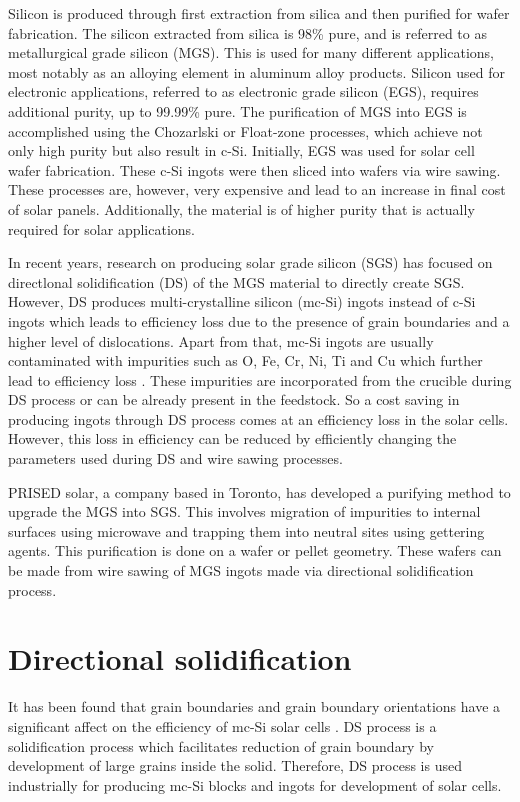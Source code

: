 Silicon is produced through first extraction from silica and then purified for wafer fabrication. The silicon extracted from silica is 98\% pure, and is referred to as metallurgical grade silicon (MGS). This is used for many different applications, most notably as an alloying element in aluminum alloy products. Silicon used for electronic applications, referred to as electronic grade silicon (EGS), requires additional purity, up to 99.99\% pure. The purification of MGS into EGS is accomplished using the Chozarlski or Float-zone processes, which achieve not only high purity but also result in c-Si. Initially, EGS was used for solar cell wafer fabrication. These c-Si ingots were then sliced into wafers via wire sawing. These processes are, however, very expensive and lead to an increase in final cost of solar panels. Additionally, the material is of higher purity that is actually required for solar applications.

In recent years, research on producing solar grade silicon (SGS) has focused on directlonal solidification (DS) of the MGS material to directly create SGS. However, DS produces multi-crystalline silicon (mc-Si) ingots instead of c-Si ingots which leads to efficiency loss due to the presence of grain boundaries and a higher level of dislocations.  Apart from that, mc-Si ingots are usually contaminated with impurities such as O, Fe, Cr, Ni, Ti and Cu which further lead to efficiency loss \cite{davis1980impurities,coletti2011impact} . These impurities are incorporated from the crucible during DS process \cite{istratov2003metal} or can be already present in the feedstock. So a cost saving in producing ingots through DS process comes at an efficiency loss in the solar cells. However, this loss in efficiency can be reduced by efficiently changing the parameters used during DS and wire sawing processes.

PRISED solar, a company based in Toronto, has developed a purifying method to upgrade the MGS into SGS. This involves migration of impurities to internal surfaces using microwave and trapping them into neutral sites using gettering agents. This purification is done on a wafer or pellet geometry. These wafers can be made from wire sawing of MGS ingots made via directional solidification process. 

\section{Directional solidification}
It has been found that grain boundaries and grain boundary orientations have a significant affect on the efficiency of mc-Si solar cells \cite{fujiwara2006directional}. DS process is a solidification process which facilitates reduction of grain boundary by development of large grains inside the solid. Therefore, DS process is used industrially for producing mc-Si blocks and ingots for development of solar cells.


